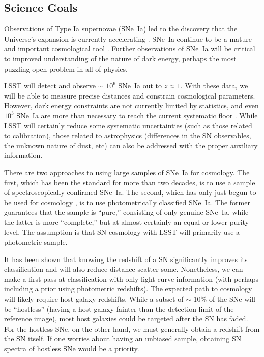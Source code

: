 \subsection{Science Goals}

Observations of Type Ia supernovae (SNe~Ia) led to the discovery that
the Universe's expansion is currently accelerating
\citep{Riess98:Lambda, Perlmutter99}.  SNe~Ia continue to be a mature
and important cosmological tool \citep[e.g.,][]{Suzuki12, Betoule14,
Rest14}.  Further observations of SNe~Ia will be critical to
improved understanding of the nature of dark energy, perhaps the most
puzzling open problem in all of physics.

LSST will detect and observe $\sim$ $10^{6}$ SNe~Ia out to $z \approx
1$.  With these data, we will be able to measure precise distances and
constrain cosmological parameters.  However, dark energy constraints
are not currently limited by statistics, and even $10^{3}$ SNe~Ia are
more than necessary to reach the current systematic floor
\citep{Betoule14, Scolnic14:ps1}.  While LSST will certainly reduce
some systematic uncertainties (such as those related to calibration),
those related to astrophysics (differences in the SN observables, the
unknown nature of dust, etc) can also be addressed with the proper
auxiliary information.

There are two approaches to using large samples of SNe~Ia for
cosmology.  The first, which has been the standard for more than two
decades, is to use a sample of spectroscopically confirmed SNe~Ia.
The second, which has only just begun to be used for cosmology
\citep{Campbell13}, is to use photometrically classified SNe~Ia.  The
former guarantees that the sample is ``pure,'' consisting of only
genuine SNe~Ia, while the latter is more ``complete,'' but at almost
certainly an equal or lower purity level.  The assumption is that SN
cosmology with LSST will primarily use a photometric sample.

It has been shown that knowing the redshift of a SN significantly
improves its classification and will also reduce distance scatter
some.  Nonetheless, we can make a first pass at classification with
only light curve information (with perhaps including a prior using
photometric redshifts).  The expected path to cosmology will likely
require host-galaxy redshifts.  While a subset of $\sim$ 10\% of the
SNe will be ``hostless'' (having a host galaxy fainter than the
detection limit of the reference image), most host galaxies could be
targeted after the SN has faded.  For the hostless SNe, on the other
hand, we must generally obtain a redshift from the SN itself.  If one
worries about having an unbiased sample, obtaining SN spectra of
hostless SNe would be a priority.

